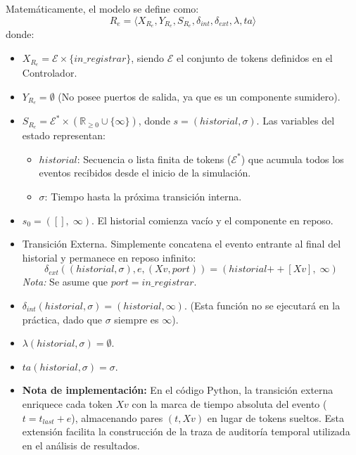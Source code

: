 Matemáticamente, el modelo se define como:
\[ R_e = \langle X_{R_e}, Y_{R_e}, S_{R_e}, \delta_{int}, \delta_{ext}, \lambda, ta \rangle \]
donde:
\begin{itemize}
    \item $X_{R_e} = \mathcal{E} \times \{in\_registrar\}$, siendo $\mathcal{E}$ el conjunto de tokens definidos en el Controlador.
    \item $Y_{R_e} = \emptyset$ (No posee puertos de salida, ya que es un componente sumidero).
    \item $S_{R_e} = \mathcal{E}^* \times (\mathbb{R}_{\geq 0} \cup \{\infty\})$, donde $s = (historial, \sigma)$.
    Las variables del estado representan:
    \begin{itemize}
        \item $historial$: Secuencia o lista finita de tokens ($\mathcal{E}^*$) que acumula todos los eventos recibidos desde el inicio de la simulación.
        \item $\sigma$: Tiempo hasta la próxima transición interna.
    \end{itemize}
    
    \item $s_0 = ([ ],\; \infty)$. El historial comienza vacío y el componente en reposo.

    \item Transición Externa. Simplemente concatena el evento entrante al final del historial y permanece en reposo infinito:
    \[
    \delta_{ext}((historial, \sigma), e, (Xv, port)) = (historial \mathbin{++} [Xv],\; \infty)
    \]
    \quad \textit{Nota:} Se asume que $port = in\_registrar$.

    \item $\delta_{int}(historial, \sigma) = (historial, \infty)$. (Esta función no se ejecutará en la práctica, dado que $\sigma$ siempre es $\infty$).
    
    \item $\lambda(historial, \sigma) = \emptyset$.
    
    \item $ta(historial, \sigma) = \sigma$.
    \item \textbf{Nota de implementación:} En el código Python, la transición externa enriquece cada token $Xv$ con la marca de tiempo absoluta del evento ($t = t_{last} + e$), almacenando pares $(t, Xv)$ en lugar de tokens sueltos. Esta extensión facilita la construcción de la traza de auditoría temporal utilizada en el análisis de resultados.
\end{itemize}

